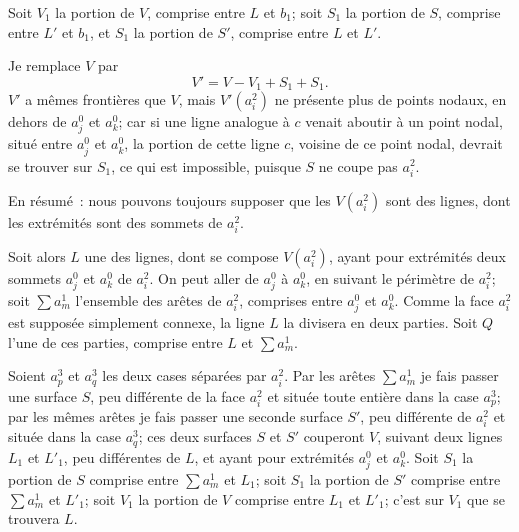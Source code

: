 \documentclass{article}
\begin{document}
Soit $V_{1}$ la portion de $V$, comprise entre $L$ et $b_{1}$; soit $S_{1}$ la portion de $S$, comprise entre $L'$ et $b_{1}$, et $S_{1}$ la portion de $S'$, comprise entre $L$ et $L'$.

Je remplace $V$ par
\[ V' = V - V_{1} + S_{1} + S_{1}. \]
$V'$ a mêmes frontières que $V$, mais $V'(a^{2}_{i})$ ne présente plus de points nodaux, en dehors de $a^{0}_{j}$ et $a^{0}_{k}$; car si une ligne analogue à $c$ venait aboutir à un point nodal, situé entre $a^{0}_{j}$ et $a^{0}_{k}$, la portion de cette ligne $c$, voisine de ce point nodal, devrait se trouver sur $S_{1}$, ce qui est impossible, puisque $S$ ne coupe pas $a^{2}_{i}$.

En résumé~: nous pouvons toujours supposer que les $V(a^{2}_{i})$ sont des lignes, dont les extrémités sont des sommets de $a^{2}_{i}$.

Soit alors $L$ une des lignes, dont se compose $V(a^{2}_{i})$, ayant pour extrémités deux sommets $a^{0}_{j}$ et $a^{0}_{k}$ de $a^{2}_{i}$. On peut aller de $a^{0}_{j}$ à $a^{0}_{k}$, en suivant le périmètre de $a^{2}_{i}$; soit $\displaystyle\sum a^{1}_{m}$ l'ensemble des arêtes de $a^{2}_{i}$, comprises entre $a^{0}_{j}$ et $a^{0}_{k}$. Comme la face $a^{2}_{i}$ est supposée simplement connexe, la ligne $L$ la divisera en deux parties. Soit $Q$ l'une de ces parties, comprise entre $L$ et $\displaystyle\sum a^{1}_{m}$.

Soient $a^{3}_{p}$ et $a^{3}_{q}$ les deux cases séparées par $a^{2}_{i}$. Par les arêtes $\displaystyle\sum a^{1}_{m}$ je fais passer une surface $S$, peu différente de la face $a^{2}_{i}$ et située toute entière dans la case $a^{3}_{p}$; par les mêmes arêtes je fais passer une seconde
surface $S'$, peu différente de $a^{2}_{i}$ et située dans la case $a^{3}_{q}$; ces deux surfaces $S$ et $S'$ couperont $V$, suivant deux lignes $L_{1}$ et $L'_{1}$, peu différentes de $L$, et ayant pour extrémités $a^{0}_{j}$ et $a^{0}_{k}$. Soit $S_{1}$ la portion de $S$ comprise entre $\displaystyle\sum a^{1}_{m}$ et $L_{1}$; soit $S_{1}$ la portion de $S'$ comprise entre $\displaystyle\sum a^{1}_{m}$ et $L'_{1}$; soit $V_{1}$ la portion de $V$ comprise entre $L_{1}$ et $L'_{1}$; c'est sur $V_{1}$ que se trouvera $L$.
\end{document}
